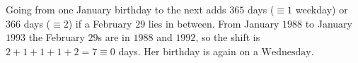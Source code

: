 Going from one January birthday to the next adds $365$ days ($\equiv1$ weekday) or $366$ days ($\equiv2$) if a February $29$ lies in between. From January $1988$ to January $1993$ the February $29$s are in $1988$ and $1992$, so the shift is $2+1+1+1+2=7\equiv0$ days. Her birthday is again on a $\boxed{\text{Wednesday}}$.
